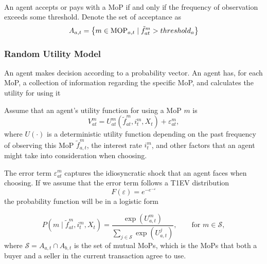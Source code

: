 \begin{definition}
   \phantom{}\\
   An agent accepts or pays with a MoP if and only if the frequency of
   observation exceeds some threshold. Denote the set of acceptance as
   \begin{equation}
      A_{a,t} = \left\{ m \in \mathrm{MOP}_{a,t} \mid \tilde{f}^m_{at}>threshold_a\right\}
   \end{equation}
\end{definition}

\subsubsection*{Random Utility Model}

An agent makes decision according to a probability vector. An agent has, for
each MoP, a collection of information regarding the specific MoP, and calculates
the utility for using it \citep*{Csik96,Matsatsinis00,Trade_ABM_MOP2006}

Assume that an agent's utility function for using a MoP $m$ is
\begin{equation}
   \label{eq:MOP-utility}
   V^m_{at} = U^m_{at}(\tilde{f}^m_{at}, i^m_t, X_t) + \varepsilon^m_{at} ,
\end{equation}
where $U(\cdot)$ is a deterministic utility function depending on the past
frequency of observing this MoP $\tilde{f}^m_{a,t}$, the interest rate $i^m_t$,
and other factors that an agent might take into consideration when choosing.

The error term $\varepsilon^m_{at}$ captures the idiosyncratic shock that an
agent faces when choosing. If we assume
that the error term follows a T1EV distribution
\begin{equation*}
   F(\varepsilon) = e^{-e^{-\varepsilon}}
\end{equation*}
the probability function will be in a logistic form \citep*{McFadden74}

\begin{definition}
   \begin{equation}
      P(m \mid \tilde{f}^m_{at}, i^m_t, X_t) =
         \frac{\exp(U^m_{a,t})}
         {
            \sum_{j \in \mathcal{S}} \exp(U^j_{a,t})
         },\qquad \text{for } m \in \mathcal{S},
   \end{equation}
   where $\mathcal{S} = A_{a,t} \cap A_{b,t}$ is the set of mutual MoPs, which is
   the MoPs that both a buyer and a seller in the current transaction agree to use.
\end{definition}

